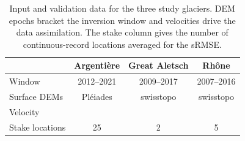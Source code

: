 \begin{table}
  \caption{Input and validation data for the three study glaciers. DEM epochs
    bracket the inversion window and velocities drive the data assimilation. The
    stake column gives the number of continuous-record locations averaged for the
    sRMSE.}
  \label{tab:data}
  \centering
  \begin{tabular}{lccc}
    \toprule
     & Argentière & Great Aletsch & Rhône \\
    \midrule
    Window            & 2012--2021 & 2009--2017 & 2007--2016 \\
    Surface DEMs      & Pléiades & swisstopo & swisstopo \\
    Velocity          & \multicolumn{3}{c}{\citep{millan2022}} \\
    Stake locations   & 25         & 2         & 5          \\
    \bottomrule
  \end{tabular}
\end{table}
